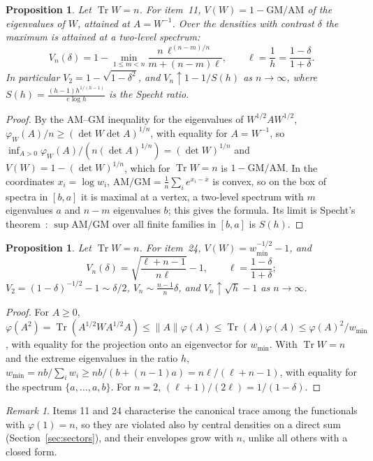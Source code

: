 \documentclass[11pt]{article}
\DeclareMathOperator{\Tr}{Tr}
\theoremstyle{plain}
\newtheorem{proposition}[theorem]{Proposition}
\theoremstyle{definition}
\theoremstyle{remark}
\newtheorem{remark}[theorem]{Remark}
\begin{document}
\begin{proposition}\label{prop:det}
Let $\Tr W=n$. For item~11, $V(W)=1-\mathrm{GM}/\mathrm{AM}$ of the eigenvalues of $W$, attained at $A=W^{-1}$. Over
the densities with contrast $\delta$ the maximum is attained at a two-level spectrum:
\[
  V_n(\delta)=1-\min_{1\le m<n}\frac{n\,\ell^{(n-m)/n}}{m+(n-m)\ell},\qquad\ell=\frac1h=\frac{1-\delta}{1+\delta}.
\]
In particular $V_2=1-\sqrt{1-\delta^2}$, and $V_n\uparrow1-1/S(h)$ as $n\to\infty$, where
$S(h)=\frac{(h-1)h^{1/(h-1)}}{e\log h}$ is the Specht ratio.
\end{proposition}
\begin{proof}
By the AM--GM inequality for the eigenvalues of $W^{1/2}AW^{1/2}$, $\varphi_W(A)/n\ge(\det W\det A)^{1/n}$, with
equality for $A=W^{-1}$, so $\inf_{A>0}\varphi_W(A)/(n(\det A)^{1/n})=(\det W)^{1/n}$ and $V(W)=1-(\det W)^{1/n}$, which
for $\Tr W=n$ is $1-\mathrm{GM}/\mathrm{AM}$. In the coordinates $x_i=\log w_i$, $\mathrm{AM}/\mathrm{GM}=\frac1n\sum_i
e^{x_i-\bar x}$ is convex, so on the box of spectra in $[b,a]$ it is maximal at a vertex, a two-level spectrum with $m$
eigenvalues $a$ and $n-m$ eigenvalues $b$; this gives the formula. Its limit is Specht's theorem~\cite{specht1960}:
$\sup\mathrm{AM}/\mathrm{GM}$ over all finite families in $[b,a]$ is $S(h)$.
\end{proof}

\begin{proposition}\label{prop:power}
Let $\Tr W=n$. For item~24, $V(W)=w_{\min}^{-1/2}-1$, and
\[
  V_n(\delta)=\sqrt{\frac{\ell+n-1}{n\ell}}-1,\qquad\ell=\frac{1-\delta}{1+\delta};
\]
$V_2=(1-\delta)^{-1/2}-1\sim\delta/2$, $V_n\sim\frac{n-1}n\delta$, and $V_n\uparrow\sqrt h-1$ as $n\to\infty$.
\end{proposition}
\begin{proof}
For $A\ge0$, $\varphi(A^2)=\Tr(A^{1/2}WA^{1/2}A)\le\|A\|\varphi(A)\le\Tr(A)\varphi(A)\le\varphi(A)^2/w_{\min}$, with equality for
the projection onto an eigenvector for $w_{\min}$. With $\Tr W=n$ and the extreme eigenvalues in the ratio $h$,
$w_{\min}=nb/\sum_iw_i\ge nb/(b+(n-1)a)=n\ell/(\ell+n-1)$, with equality for the spectrum $\{a,\dots,a,b\}$. For
$n=2$, $(\ell+1)/(2\ell)=1/(1-\delta)$.
\end{proof}

\begin{remark}
Items 11 and 24 characterise the canonical trace among the functionals with $\varphi(1)=n$, so they are violated also by
central densities on a direct sum (Section~\ref{sec:sectors}), and their envelopes grow with $n$, unlike all others with
a closed form.
\end{remark}
\end{document}
